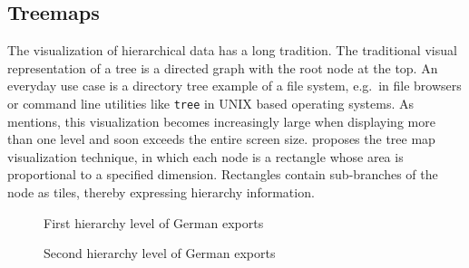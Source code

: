 \subsection{Treemaps}
The visualization of hierarchical data has a long tradition.
The traditional visual representation of a tree is a directed graph with the root node at the top.
An everyday use case is a directory tree example of a file system, e.g.\ in file browsers or command line utilities like \texttt{tree} in UNIX based operating systems.
As \textcite{Shneiderman1992} mentions, this visualization becomes increasingly large when displaying more than one level and soon exceeds the entire screen size.
\textcite{Johnson1991} proposes the tree map visualization technique, in which each node is a rectangle whose area is proportional to a specified dimension.
Rectangles contain sub-branches of the node as tiles, thereby expressing hierarchy information.
\begin{figure}[ht]
    \centering
    \caption{First hierarchy level of German exports}\label{fig:related-work:treemap-german-exports-1}
\end{figure}

\begin{figure}[ht]
    \centering
    \caption{Second hierarchy level of German exports}\label{fig:related-work:treemap-german-exports-2}
\end{figure}

